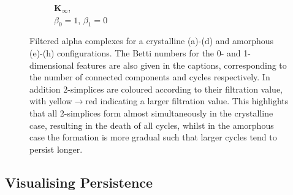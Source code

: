 \begin{figure}[tb]
\begin{subfigure}[b]{0.22\textwidth}
         \caption{$\mathbf{K}_\infty$,\\ $\beta_0=1$, $\beta_1=0$}
         \label{fig:phexh}
     \end{subfigure}
   
	\caption{Filtered alpha complexes for a crystalline (a)\--(d) and amorphous (e)\--(h) configurations. The Betti numbers for the 0\-- and 1\--dimensional features are also given in the captions, corresponding to the number of connected components and cycles respectively. In addition 2\--simplices are coloured according to their filtration value, with yellow$\rightarrow$red indicating a larger filtration value. This highlights that all 2\--simplices form almost simultaneously in the crystalline case, resulting in the death of all cycles, whilst in the amorphous case the formation is more gradual such that larger cycles tend to persist longer.}
	\label{fig:phex}
\end{figure}

\subsection{Visualising Persistence}

